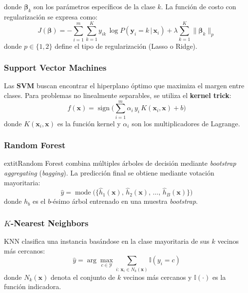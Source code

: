 \documentclass[conference]{IEEEtran}
\begin{document}
donde $\mathbf{\beta}_k$ son los parámetros específicos de la clase $k$. La función de costo con regularización se expresa como:
\begin{equation}
J(\mathbf{\beta}) = - \sum_{i=1}^m \sum_{k=1}^K y_{ik} \, \log P(\mathbf{y}_i = k \,|\, \mathbf{x}_i) + \lambda \sum_{k=1}^K \lVert \mathbf{\beta}_k \rVert_p
\label{eq:logistic_cost}
\end{equation}
donde $p \in \{1, 2\}$ define el tipo de regularización (Lasso o Ridge).

\subsubsection{Support Vector Machines}
Las \textbf{SVM} buscan encontrar el hiperplano óptimo que maximiza el margen entre clases. Para problemas no linealmente separables, se utiliza el \textbf{kernel trick}:
\begin{equation}
f(\mathbf{x}) = \operatorname{sign} \Bigg( \sum_{i=1}^m \alpha_i \, y_i \, K(\mathbf{x}_i, \mathbf{x}) + b \Bigg)
\label{eq:svm_decision}
\end{equation}
donde $K(\mathbf{x}_i, \mathbf{x})$ es la función kernel y $\alpha_i$ son los multiplicadores de Lagrange.

\subsubsection{Random Forest}
    	extit{Random Forest} combina múltiples árboles de decisión mediante \textit{bootstrap aggregating} (\textit{bagging}). La predicción final se obtiene mediante votación mayoritaria:
\begin{equation}
\hat{y} = \operatorname{mode}\big(\{\hat{h}_1(\mathbf{x}), \, \hat{h}_2(\mathbf{x}), \, \dots, \, \hat{h}_B(\mathbf{x})\}\big)
\label{eq:rf_mode}
\end{equation}
donde $h_b$ es el $b$-ésimo árbol entrenado en una muestra \textit{bootstrap}.

\subsubsection{$K$-Nearest Neighbors}
KNN clasifica una instancia basándose en la clase mayoritaria de sus $k$ vecinos más cercanos:
\begin{equation}
\hat{y} = \arg\max_{c \in \mathcal{Y}} \sum_{i:\, \mathbf{x}_i \in N_k(\mathbf{x})} \mathbb{I}(y_i = c)
\label{eq:knn_rule}
\end{equation}
donde $N_k(\mathbf{x})$ denota el conjunto de $k$ vecinos más cercanos y $\mathbb{I}(\cdot)$ es la función indicadora.
\end{document}
